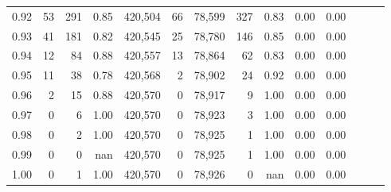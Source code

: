 \begin{tabular}{rrrrrrrrrrrrrr}
0.92 &     53 &    291 &  0.85 &  420,504 &       66 &  78,599 &     327 &  0.83 &  0.00 &      0.00 \\
0.93 &     41 &    181 &  0.82 &  420,545 &       25 &  78,780 &     146 &  0.85 &  0.00 &      0.00 \\
0.94 &     12 &     84 &  0.88 &  420,557 &       13 &  78,864 &      62 &  0.83 &  0.00 &      0.00 \\
0.95 &     11 &     38 &  0.78 &  420,568 &        2 &  78,902 &      24 &  0.92 &  0.00 &      0.00 \\
0.96 &      2 &     15 &  0.88 &  420,570 &        0 &  78,917 &       9 &  1.00 &  0.00 &      0.00 \\
0.97 &      0 &      6 &  1.00 &  420,570 &        0 &  78,923 &       3 &  1.00 &  0.00 &      0.00 \\
0.98 &      0 &      2 &  1.00 &  420,570 &        0 &  78,925 &       1 &  1.00 &  0.00 &      0.00 \\
0.99 &      0 &      0 &   nan &  420,570 &        0 &  78,925 &       1 &  1.00 &  0.00 &      0.00 \\
1.00 &      0 &      1 &  1.00 &  420,570 &        0 &  78,926 &       0 &   nan &  0.00 &      0.00 \\
\bottomrule
\end{tabular}
